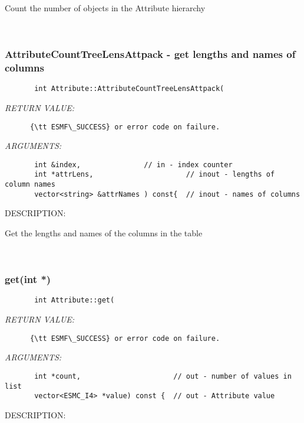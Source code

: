        Count the number of objects in the Attribute hierarchy
  
 
\mbox{}\hrulefill\
 
\subsubsection [AttributeCountTreeLensAttpack] {AttributeCountTreeLensAttpack - get lengths and names of columns}


  
\begin{verbatim}       int Attribute::AttributeCountTreeLensAttpack(
   \end{verbatim}{\em RETURN VALUE:}
\begin{verbatim}      {\tt ESMF\_SUCCESS} or error code on failure.
   \end{verbatim}{\em ARGUMENTS:}
\begin{verbatim}       int &index,               // in - index counter
       int *attrLens,                      // inout - lengths of column names
       vector<string> &attrNames ) const{  // inout - names of columns
   \end{verbatim}
{\sf DESCRIPTION:\\ }


       Get the lengths and names of the columns in the table
  
 
\mbox{}\hrulefill\
 
\subsubsection [get(int] {get(int *)}


  
\begin{verbatim}       int Attribute::get(
   \end{verbatim}{\em RETURN VALUE:}
\begin{verbatim}      {\tt ESMF\_SUCCESS} or error code on failure.
   \end{verbatim}{\em ARGUMENTS:}
\begin{verbatim}       int *count,                      // out - number of values in list
       vector<ESMC_I4> *value) const {  // out - Attribute value
   \end{verbatim}
{\sf DESCRIPTION:\\ }


